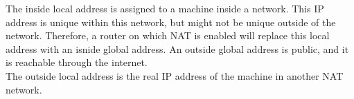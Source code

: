 

The inside local address is assigned to a machine inside a network. This IP address is unique within this network, but might not be unique outside of the network.
Therefore, a router on which NAT is enabled will replace this local address with an isnide global address.
An outside global address is public, and it is reachable through the internet. \\
The outside local address is the real IP address of the machine in another NAT network.